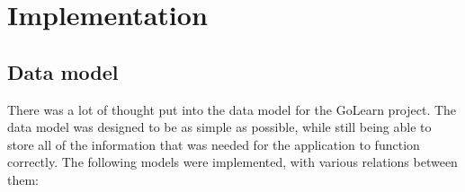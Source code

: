 \documentclass[11pt, a4paper,twoside]{report}
\theoremstyle{plain} %
\theoremstyle{definition} %
\numberwithin{equation}{chapter}
\begin{document}

\chapter{Implementation}\label{ch:implementation}

\section{Data model}\label{sec:datamodel}

There was a lot of thought put into the data model for the GoLearn project.
The data model was designed to be as simple as possible, while still being
able to store all of the information that was needed for the application to
function correctly. The following models were implemented, with various
relations between them:
\end{document}
